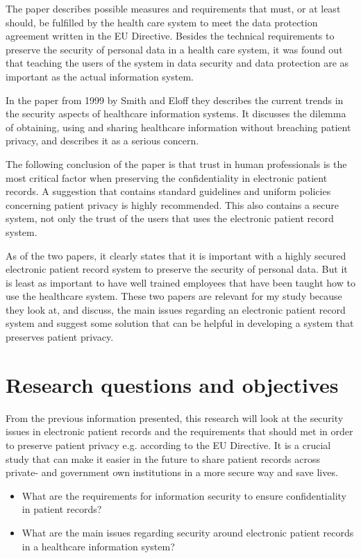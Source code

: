 \documentclass[11pt, a4paper]{article}
\begin{document}
The paper describes possible measures and requirements that must, or at least should, be fulfilled by the health care system to meet the data protection agreement written in the EU Directive. Besides the technical requirements to preserve the security of personal data in a health care system, it was found out that teaching the users of the system in data security and data protection are as important as the actual information system.

In the paper from 1999 by Smith and Eloff\cite{Smith199939} they describes the current trends in the security aspects of healthcare information systems. It discusses the dilemma of obtaining, using and sharing healthcare information without breaching patient privacy, and describes it as a serious concern. 

The following conclusion of the paper is that trust in human professionals is the most critical factor when preserving the confidentiality in electronic patient records. A suggestion that contains standard guidelines and uniform policies concerning patient privacy is highly recommended. This also contains a secure system, not only the trust of the users that uses the electronic patient record system.  

As of the two papers, it clearly states that it is important with a highly secured electronic patient record system to preserve the security of personal data. But it is least as important to have well trained employees that have been taught how to use the healthcare system. These two papers are relevant for my study because they look at, and discuss, the main issues regarding an electronic patient record system and suggest some solution that can be helpful in developing a system that preserves patient privacy.

\section{Research questions and objectives}

From the previous information presented, this research will look at the security issues in electronic patient records and the requirements that should met in order to preserve patient privacy e.g. according to the EU Directive. It is a crucial study that can make it easier in the future to share patient records across private- and government own institutions in a more secure way and save lives.  

\begin{itemize}
\item What are the requirements for information security to ensure confidentiality in patient records?
\item What are the main issues regarding security around electronic patient records in a healthcare information system?
\end{itemize}


\end{document}
